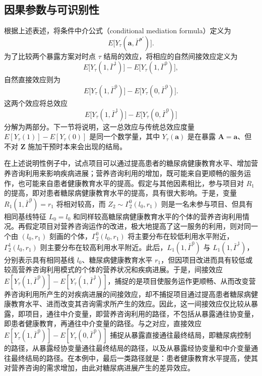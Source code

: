 \subsection{因果参数与可识别性}

根据上述表述，将条件中介公式（conditional mediation formula）定义为
\begin{equation}
 E\bigl[Y_\tau(\mathbf a,\bar\Gamma^{\mathbf a'})\bigr].
 \tag{17.2}
\end{equation}
为了比较两个暴露方案对时点 $\tau$ 结局的效应，将相应的自然间接效应定义为
\begin{equation}
 E\bigl[Y_\tau(1,\bar\Gamma^1)\bigr]-E\bigl[Y_\tau(1,\bar\Gamma^0)\bigr],
 \tag{17.3}
\end{equation}
自然直接效应则为
\begin{equation}
 E\bigl[Y_\tau(1,\bar\Gamma^0)\bigr]-E\bigl[Y_\tau(0,\bar\Gamma^0)\bigr].
 \tag{17.4}
\end{equation}
这两个效应将总效应
\[
 E\bigl[Y_\tau(1,\bar\Gamma^1)\bigr]-E\bigl[Y_\tau(0,\bar\Gamma^0)\bigr]
\]
分解为两部分。下一节将说明，这一总效应与传统总效应度量 $E[Y_\tau(1)]-E[Y_\tau(0)]$ 是同一个数学量，其中 $Y_\tau(\mathbf a)$ 是在暴露 $\mathbf A=\mathbf a$、但不对 $\mathbf Z$ 施加干预时本来会出现的结局。

在上述说明性例子中，试点项目可以通过提高患者的糖尿病健康教育水平、增加营养咨询利用来影响疾病进展；营养咨询利用的增加，既可能来自更顺畅的服务运作，也可能来自患者健康教育水平的提高。假定与其他因素相比，参与项目对 $R_1$ 的提高，即对患者糖尿病健康教育水平的提高，具有很大影响。于是，变量 $R_1(1,\bar\Gamma^0)=r_1$ 将相对较高，而 $Z_2\sim\Gamma_2^0(l_0,r_1)$ 则是一名未参与项目、但具有相同基线特征 $L_0=l_0$ 和同样较高糖尿病健康教育水平的个体的营养咨询利用情况。再假定项目对营养咨询运作的改进，极大地提高了这一服务的利用，则对同一个由 $(l_0,r_1)$ 刻画的个体，$\Gamma_2^0(l_0,r_1)$ 将主要分布在较低利用水平附近，$\Gamma_2^1(l_0,r_1)$ 则主要分布在较高利用水平附近。此后，$L_1(1,\bar\Gamma^0)$ 与 $L_1(1,\bar\Gamma^1)$，分别表示具有相同基线 $l_0$、糖尿病健康教育水平 $r_1$，但因项目改进而具有较低或较高营养咨询利用模式的个体的营养状况和疾病进展。于是，间接效应 $E[Y_\tau(1,\bar\Gamma^0)]-E[Y_\tau(1,\bar\Gamma^1)]$，捕捉的是项目使服务运作更顺畅、从而改变营养咨询利用所产生的对疾病进展的间接效应，却不捕捉项目通过提高患者糖尿病健康教育水平、进而改变其咨询需求所产生的效应。因此，这一间接效应仅比较从暴露，即项目，通往中介变量，即营养咨询利用的路径，不包括从暴露通往协变量，即患者健康教育，再通往中介变量的路径。与之对应，直接效应 $E[Y_\tau(1,\bar\Gamma^0)]-E[Y_\tau(0,\bar\Gamma^0)]$ 捕捉从暴露直接通往最终结局，即糖尿病控制的路径，从暴露经协变量通往最终结局的路径，以及从暴露经协变量和中介变量通往最终结局的路径。在本例中，最后一类路径就是：患者健康教育水平提高，使其对营养咨询的需求增加，由此对糖尿病进展产生的差异效应。

